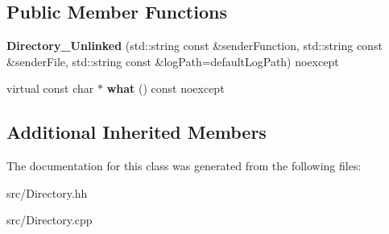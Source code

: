 \subsection*{Public Member Functions}
\begin{DoxyCompactItemize}
\item 
\hypertarget{classstb_1_1Directory__Unlinked_af793a56524a7e740a038ababd05b4554}{{\bfseries Directory\+\_\+\+Unlinked} (std\+::string const \&sender\+Function, std\+::string const \&sender\+File, std\+::string const \&log\+Path=default\+Log\+Path) noexcept}\label{classstb_1_1Directory__Unlinked_af793a56524a7e740a038ababd05b4554}

\item 
\hypertarget{classstb_1_1Directory__Unlinked_ad74eb6bdb3c908a69531f177dd3802f0}{virtual const char $\ast$ {\bfseries what} () const noexcept}\label{classstb_1_1Directory__Unlinked_ad74eb6bdb3c908a69531f177dd3802f0}

\end{DoxyCompactItemize}
\subsection*{Additional Inherited Members}


The documentation for this class was generated from the following files\+:\begin{DoxyCompactItemize}
\item 
src/Directory.\+hh\item 
src/Directory.\+cpp\end{DoxyCompactItemize}
